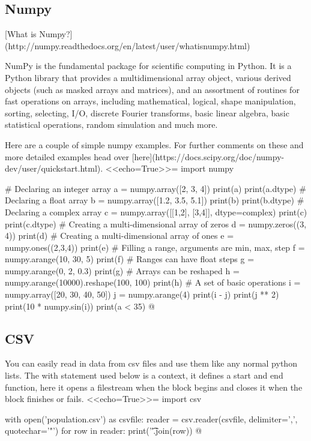 \documentclass[12pt]{exam}
\begin{document}
\subsection*{Numpy}
[What is Numpy?](http://numpy.readthedocs.org/en/latest/user/whatisnumpy.html)

NumPy is the fundamental package for scientific computing in Python. It is a Python library that provides a
multidimensional array object, various derived objects (such as masked arrays and matrices), and an assortment of
routines for fast operations on arrays, including mathematical, logical, shape manipulation, sorting, selecting, I/O,
discrete Fourier transforms, basic linear algebra, basic statistical operations, random simulation and much more.

Here are a couple of simple numpy examples. For further comments on these and more detailed examples head over
[here](https://docs.scipy.org/doc/numpy-dev/user/quickstart.html).
<<echo=True>>=
import numpy

# Declaring an integer array
a = numpy.array([2, 3, 4])
print(a)
print(a.dtype)
# Declaring a float array
b = numpy.array([1.2, 3.5, 5.1])
print(b)
print(b.dtype)
# Declaring a complex array
c = numpy.array([[1,2], [3,4]], dtype=complex)
print(c)
print(c.dtype)
# Creating a multi-dimensional array of zeros
d = numpy.zeros((3, 4))
print(d)
# Creating a multi-dimensional array of ones
e = numpy.ones((2,3,4))
print(e)
# Filling a range, arguments are min, max, step
f = numpy.arange(10, 30, 5)
print(f)
# Ranges can have float steps
g = numpy.arange(0, 2, 0.3)
print(g)
# Arrays can be reshaped
h = numpy.arange(10000).reshape(100, 100)
print(h)
# A set of basic operations
i = numpy.array([20, 30, 40, 50])
j = numpy.arange(4)
print(i - j)
print(j ** 2)
print(10 * numpy.sin(i))
print(a < 35)
@


\subsection*{CSV}
You can easily read in data from csv files and use them like any normal python lists. The with statement used below is a
context, it defines a start and end function, here it opens a filestream when the block begins and closes it when the
block finishes or fails.
<<echo=True>>=
import csv

with open('population.csv') as csvfile:
    reader = csv.reader(csvfile, delimiter=',', quotechar='"')
    for row in reader:
        print('\t'.join(row))
@
\end{document}

